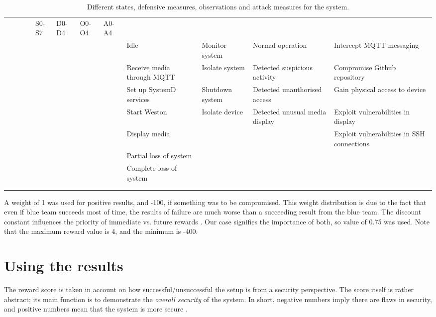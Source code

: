 \begin{landscape}
\begin{table}
\centering
\begin{tabular}{ |c|c|c|c| }
 \hline & & & & S0-S7 & D0-D4 & O0-O4 & A0-A4 \\ & & & & \hline \hline
 & & & & Idle & Monitor system & Normal operation & Intercept MQTT
 messaging \\ & & & & \hline & & & & Receive media through MQTT &
 Isolate system & Detected suspicious activity & Compromise Github
 repository \\ & & & & \hline & & & & Set up SystemD services &
 Shutdown system & Detected unauthorised access & Gain physical access
 to device \\ & & & & \hline & & & & Start Weston & Isolate device &
 Detected unusual media display & Exploit vulnerabilities in display
 \\ & & & & \hline & & & & Display media & & & Exploit vulnerabilities
 in SSH connections \\ & & & & \hline & & & & Partial loss of system &
 \ & \ & \\ & & & & \hline & & & & Complete loss of system & & & \\ &
 & & & \hline & & & & & & & \\ & & & & \hline

\end{tabular}
\caption{Different states, defensive measures, observations and attack
  measures for the system.}
\label{pomdbtable}
\end{table}
\end{landscape}

A weight of 1 was used for positive results, and -100, if something
was to be compromised. This weight distribution is due to the fact
that even if blue team succeeds most of time, the results of failure
are much worse than a succeeding result from the blue team. The
discount constant influences the priority of immediate
vs. future rewards \cite{mcabeeMarkov}. Our case signifies the
importance of both, so value of 0.75 was used. Note that the maximum
reward value is 4, and the minimum is -400.

\section{Using the results} \label{usingtheresults}

The reward score is taken in account on how
successful/unsuccessful the setup is from a security perspective. The
score itself is rather abstract; its main function is to demonstrate
the \textit{overall security} of the system. In short, negative
numbers imply there are flaws in security, and positive numbers mean
that the system is more secure
\cite{mcabeeMarkov}.


